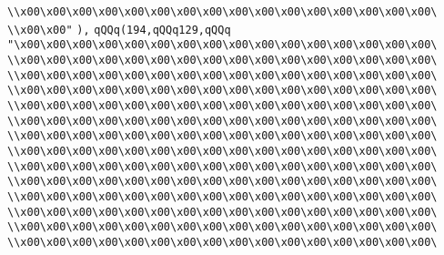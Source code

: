 \verb|\\x00\x00\x00\x00\x00\x00\x00\x00\x00\x00\x00\x00\x00\x00\x00\x00\|\newline
\verb|\\x00\x00"|\newline
\verb|),|\newline
\verb|qQQq(194,qQQq129,qQQq|\newline
\verb|"\x00\x00\x00\x00\x00\x00\x00\x00\x00\x00\x00\x00\x00\x00\x00\x00\|\newline
\verb|\\x00\x00\x00\x00\x00\x00\x00\x00\x00\x00\x00\x00\x00\x00\x00\x00\|\newline
\verb|\\x00\x00\x00\x00\x00\x00\x00\x00\x00\x00\x00\x00\x00\x00\x00\x00\|\newline
\verb|\\x00\x00\x00\x00\x00\x00\x00\x00\x00\x00\x00\x00\x00\x00\x00\x00\|\newline
\verb|\\x00\x00\x00\x00\x00\x00\x00\x00\x00\x00\x00\x00\x00\x00\x00\x00\|\newline
\verb|\\x00\x00\x00\x00\x00\x00\x00\x00\x00\x00\x00\x00\x00\x00\x00\x00\|\newline
\verb|\\x00\x00\x00\x00\x00\x00\x00\x00\x00\x00\x00\x00\x00\x00\x00\x00\|\newline
\verb|\\x00\x00\x00\x00\x00\x00\x00\x00\x00\x00\x00\x00\x00\x00\x00\x00\|\newline
\verb|\\x00\x00\x00\x00\x00\x00\x00\x00\x00\x00\x00\x00\x00\x00\x00\x00\|\newline
\verb|\\x00\x00\x00\x00\x00\x00\x00\x00\x00\x00\x00\x00\x00\x00\x00\x00\|\newline
\verb|\\x00\x00\x00\x00\x00\x00\x00\x00\x00\x00\x00\x00\x00\x00\x00\x00\|\newline
\verb|\\x00\x00\x00\x00\x00\x00\x00\x00\x00\x00\x00\x00\x00\x00\x00\x00\|\newline
\verb|\\x00\x00\x00\x00\x00\x00\x00\x00\x00\x00\x00\x00\x00\x00\x00\x00\|\newline
\verb|\\x00\x00\x00\x00\x00\x00\x00\x00\x00\x00\x00\x00\x00\x00\x00\x00\|\newline
